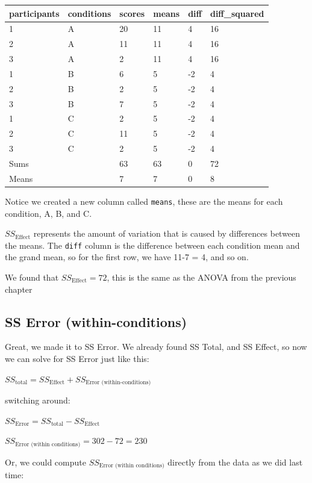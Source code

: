 \documentclass[
]{book}
\begin{document}
\begin{tabular}[t]{l|l|l|l|l|l}
\hline
participants & conditions & scores & means & diff & diff\_squared\\
\hline
1 & A & 20 & 11 & 4 & 16\\
\hline
2 & A & 11 & 11 & 4 & 16\\
\hline
3 & A & 2 & 11 & 4 & 16\\
\hline
1 & B & 6 & 5 & -2 & 4\\
\hline
2 & B & 2 & 5 & -2 & 4\\
\hline
3 & B & 7 & 5 & -2 & 4\\
\hline
1 & C & 2 & 5 & -2 & 4\\
\hline
2 & C & 11 & 5 & -2 & 4\\
\hline
3 & C & 2 & 5 & -2 & 4\\
\hline
Sums &  & 63 & 63 & 0 & 72\\
\hline
Means &  & 7 & 7 & 0 & 8\\
\hline
\end{tabular}

Notice we created a new column called \texttt{means}, these are the means for each condition, A, B, and C.

\(SS_\text{Effect}\) represents the amount of variation that is caused by differences between the means. The \texttt{diff} column is the difference between each condition mean and the grand mean, so for the first row, we have 11-7 = 4, and so on.

We found that \(SS_\text{Effect} = 72\), this is the same as the ANOVA from the previous chapter

\subsection{SS Error (within-conditions)}\label{ss-error-within-conditions}

Great, we made it to SS Error. We already found SS Total, and SS Effect, so now we can solve for SS Error just like this:

\(SS_\text{total} = SS_\text{Effect} + SS_\text{Error (within-conditions)}\)

switching around:

\(SS_\text{Error} = SS_\text{total} - SS_\text{Effect}\)

\(SS_\text{Error (within conditions)} = 302 - 72 = 230\)

Or, we could compute \(SS_\text{Error (within conditions)}\) directly from the data as we did last time:
\end{document}
